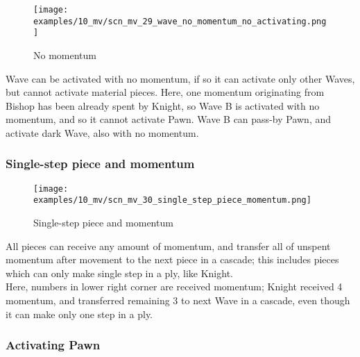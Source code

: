 \vspace*{-1.4\baselineskip}
\noindent
\begin{figure}[h]
\texttt{[image: examples/10\_mv/scn\_mv\_29\_wave\_no\_momentum\_no\_activating.png]}
\caption{No momentum}
\label{fig:scn_mv_29_wave_no_momentum_no_activating}
\end{figure}

Wave can be activated with no momentum, if so it can activate only other Waves, but
cannot activate material pieces. Here, one momentum originating from Bishop has been
already spent by Knight, so Wave B is activated with no momentum, and so it cannot
activate Pawn. Wave B can pass-by Pawn, and activate dark Wave, also with no momentum.

\clearpage %

\subsubsection*{Single-step piece and momentum}
\label{sec:Miranda's veil/Wave/Cascading Waves/Single-step piece and momentum}

\vspace*{-1.5\baselineskip}
\noindent
\begin{figure}[h]
\texttt{[image: examples/10\_mv/scn\_mv\_30\_single\_step\_piece\_momentum.png]}
\vspace*{-1.4\baselineskip}
\caption{Single-step piece and momentum}
\label{fig:scn_mv_30_single_step_piece_momentum}
\end{figure}

\vspace*{-0.5\baselineskip}
All pieces can receive any amount of momentum, and transfer all of unspent momentum
after movement to the next piece in a cascade; this includes pieces which can only
make single step in a ply, like Knight. \\
Here, numbers in lower right corner are received momentum; Knight received 4 momentum,
and transferred remaining 3 to next Wave in a cascade, even though it can make only one
step in a ply.

\clearpage %

\subsubsection*{Activating Pawn}
\label{sec:Miranda's veil/Wave/Cascading Waves/Activating Pawn}

